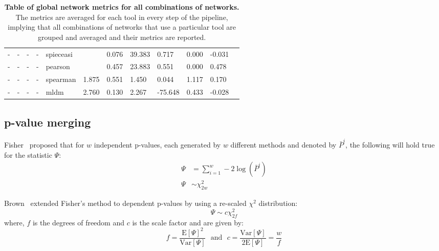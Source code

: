 \begin{landscape}
\begin{table}[H]
\begin{tabular}{|l|p{1cm}|p{1cm}|p{1cm}|p{2cm}|p{1.5cm}|p{1.5cm}|p{1.5cm}|p{1.5cm}|p{1.5cm}|p{1.5cm}|p{1.5cm}|}
  -  & -             & -                 & -           & spieceasi  &                              & 0.076              & 39.383                      & 0.717      & 0.000             & -0.031                           \\
  -  & -             & -                 & -           & pearson    &                              & 0.457              & 23.883                      & 0.551      & 0.000             & 0.478                            \\
  -  & -             & -                 & -           & spearman   & 1.875                        & 0.551              & 1.450                       & 0.044      & 1.117             & 0.170                            \\
  -  & -             & -                 & -           & mldm       & 2.760                        & 0.130              & 2.267                       & -75.648    & 0.433             & -0.028                           \\ \hline
  \end{tabular}
  \caption{
    \textbf{Table of global network metrics for all combinations of networks.}
    The metrics are averaged for each tool in every step of the pipeline, implying that all combinations of networks that use a particular tool are grouped and averaged and their metrics are reported.
  }
  \label{tab:network_metrics}
  \end{table}
  \end{landscape}


  \subsection*{p-value merging}

  Fisher~\cite{fisher_224a_1948} proposed that for $w$ independent p-values, each generated by $w$ different methods and denoted by $\bar{P}^i$, the following will hold true for the statistic $\Psi$:
  \begin{equation*}
    \begin{aligned}
      \Psi &= \sum_{i=1}^w -2 \log \left( \bar{P}^i \right) \\
        \Psi &\sim \chi^2_{2w}
    \end{aligned}
  \end{equation*}

  Brown~\cite{brown_400_1975} extended Fisher's method to dependent p-values by using a re-scaled $\chi^2$ distribution:
  \begin{equation*}
    \Psi \sim c \chi^2_{2f}
  \end{equation*}
  where, $f$ is the degrees of freedom and $c$ is the scale factor and are given by:
  \begin{equation*}
    f = \frac{\mathrm{E}[\Psi]^2}{\mathrm{Var}[\Psi]} ~~~\text{and}~~~ c = \frac{\mathrm{Var}[\Psi]}{2\mathrm{E}[\Psi]} = \frac{w}{f}
  \end{equation*}

